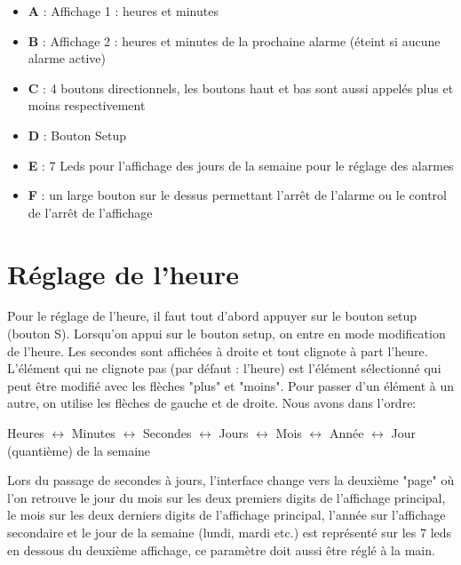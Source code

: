 \documentclass{article}
\begin{document}
\begin{itemize}
    \item \textbf{A} : Affichage 1 : heures et minutes
    \item \textbf{B} : Affichage 2 : heures et minutes de la prochaine alarme (éteint si aucune alarme
    active)
    \item \textbf{C} : 4 boutons directionnels, les boutons haut et bas sont aussi appelés plus et
    moins respectivement
    \item \textbf{D} : Bouton Setup
    \item \textbf{E} : 7 Leds pour l'affichage des jours de la semaine pour le réglage des alarmes
    \item \textbf{F} : un large bouton sur le dessus permettant l'arrêt de l'alarme ou le control de
    l'arrêt de l'affichage
\end{itemize}

\section{Réglage de l'heure}

Pour le réglage de l'heure, il faut tout d'abord appuyer sur le bouton setup (bouton S).
Lorsqu'on appui sur le bouton setup, on entre en mode modification de l'heure. Les secondes sont
affichées à droite et tout clignote à part l'heure. L'élément qui ne clignote pas (par défaut : l'heure)
est l'élément sélectionné qui peut être modifié avec les flèches "plus" et "moins". Pour passer d'un
élément à un autre, on utilise les flèches de gauche et de droite. Nous avons dans l'ordre:
\newline

Heures $\leftrightarrow$ Minutes $\leftrightarrow$ Secondes $\leftrightarrow$ Jours
$\leftrightarrow$ Mois $\leftrightarrow$ Année $\leftrightarrow$ Jour (quantième) de la semaine
\newline

Lors du passage de secondes à jours, l'interface change vers la deuxième "page" où l'on retrouve le jour
du mois sur les deux premiers digits de l'affichage principal,
le mois sur les deux derniers digits de l'affichage principal, l'année sur l'affichage secondaire et le
jour de la semaine (lundi, mardi etc.) est représenté sur les 7 leds en dessous du deuxième affichage,
ce paramètre doit aussi être réglé à la main.
\end{document}
